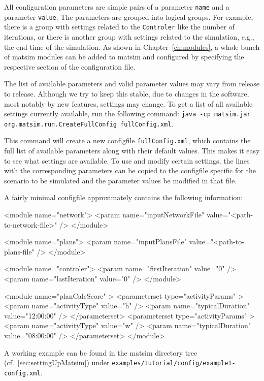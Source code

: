 All configuration parameters are simple pairs of a \gls{parameter} \lstinline|name| and a \gls{parameter} \lstinline|value|. The \glspl{parameter} are grouped into logical groups. For example, there is a group with settings related to the \lstinline|Controler| like the number of \glspl{iteration}, or there is another group with settings related to the \gls{simulation}, e.g.,\,the end time of the simulation. As shown in Chapter~\ref{ch:modules}, a whole bunch of \gls{matsim} modules can be added to \gls{matsim} and configured by specifying the respective section of the configuration file.

The list of available parameters and valid parameter values may vary from release to release. Although we try to keep this stable, due to changes in the software, most notably by new features, settings may change. To get a list of all available settings currently available, run the following command: \lstinline|java -cp matsim.jar org.matsim.run.CreateFullConfig fullConfig.xml|.

This command will create a new \gls{configfile} \lstinline|fullConfig.xml|, which contains the full list of available parameters along with their default values. This makes it easy to see what settings are available. To use and modify certain settings, the lines with the corresponding parameters can be copied to the \gls{configfile} specific for the \gls{scenario} to be simulated and the parameter values be modified in that file. 

A fairly minimal \gls{configfile} approximately contains the following information:
\begin{xml}
<module name="network">
   <param name="inputNetworkFile" value="<path-to-network-file>" />
</module>

<module name="plans">
   <param name="inputPlansFile" value="<path-to-plans-file" />
</module>

<module name="controler">
   <param name="firstIteration" value="0" />
   <param name="lastIteration" value="0" />
</module>

<module name="planCalcScore" >
   <parameterset type="activityParams" >
      <param name="activityType" value="h" />
      <param name="typicalDuration" value="12:00:00" />
   </parameterset>
   <parameterset type="activityParams" >
      <param name="activityType" value="w" />
      <param name="typicalDuration" value="08:00:00" />
   </parameterset>
</module>
\end{xml}
A working example can be found in the \gls{matsim} directory tree (cf.~\ref{sec:settingUpMatsim}) under \lstinline{examples/tutorial/config/example1-config.xml}.

